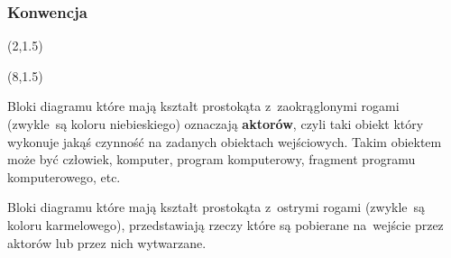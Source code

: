 \documentclass[10pt,t]{beamer}
\begin{document}
\begin{frame}
  \frametitle{Konwencja}


  \begin{textblock}{2.8}(2,1.5)


  \end{textblock}



  \begin{textblock}{2.8}(8,1.5)


  \end{textblock}


  \vspace{6em}





  Bloki diagramu które mają kształt prostokąta z~zaokrąglonymi rogami
  (zwykle~są koloru niebieskiego) oznaczają \textbf{aktorów}, czyli
  taki obiekt który wykonuje jakąś czynność na zadanych obiektach
  wejściowych. Takim obiektem może być człowiek, komputer, program
  komputerowy, fragment programu komputerowego, etc.

  Bloki diagramu które mają kształt prostokąta z~ostrymi rogami (zwykle~są
  koloru karmelowego), przedstawiają rzeczy które są pobierane na~wejście
  przez aktorów lub przez nich wytwarzane.

\end{frame}
\end{document}
